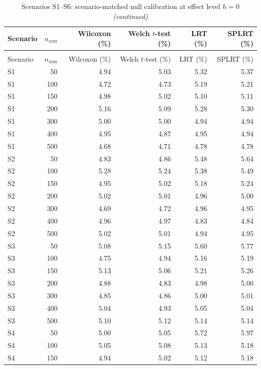 \documentclass[11pt]{article}
\begin{document}
\begin{longtable}[t]{lrrrrr}
\caption{Scenarios S1--S6: scenario-matched null calibration at effect level $h = 0$}\\
\toprule
Scenario & $n_{\mathrm{arm}}$ & Wilcoxon (\%) & Welch $t$-test (\%) & LRT (\%) & SPLRT (\%)\\
\midrule
\endfirsthead
\caption[]{Scenarios S1--S6: scenario-matched null calibration at effect level $h = 0$ \textit{(continued)}}\\
\toprule
Scenario & $n_{\mathrm{arm}}$ & Wilcoxon (\%) & Welch $t$-test (\%) & LRT (\%) & SPLRT (\%)\\
\midrule
\endhead

\endfoot
\bottomrule
\endlastfoot
S1 & 50 & 4.94 & 5.03 & 5.32 & 5.37\\
S1 & 100 & 4.72 & 4.73 & 5.19 & 5.21\\
S1 & 150 & 4.98 & 5.02 & 5.10 & 5.11\\
S1 & 200 & 5.16 & 5.09 & 5.28 & 5.30\\
S1 & 300 & 5.00 & 5.00 & 4.94 & 4.94\\
S1 & 400 & 4.95 & 4.87 & 4.95 & 4.94\\
S1 & 500 & 4.68 & 4.71 & 4.78 & 4.78\\
S2 & 50 & 4.83 & 4.86 & 5.48 & 5.64\\
S2 & 100 & 5.28 & 5.24 & 5.38 & 5.49\\
S2 & 150 & 4.95 & 5.02 & 5.18 & 5.24\\
S2 & 200 & 5.02 & 5.01 & 4.96 & 5.00\\
S2 & 300 & 4.69 & 4.72 & 4.96 & 4.95\\
S2 & 400 & 4.96 & 4.97 & 4.83 & 4.84\\
S2 & 500 & 5.02 & 5.01 & 4.94 & 4.95\\
S3 & 50 & 5.08 & 5.15 & 5.60 & 5.77\\
S3 & 100 & 4.75 & 4.94 & 5.16 & 5.19\\
S3 & 150 & 5.13 & 5.06 & 5.21 & 5.26\\
S3 & 200 & 4.88 & 4.83 & 4.98 & 5.00\\
S3 & 300 & 4.85 & 4.86 & 5.00 & 5.01\\
S3 & 400 & 5.04 & 4.93 & 5.05 & 5.04\\
S3 & 500 & 5.10 & 5.12 & 5.14 & 5.14\\
S4 & 50 & 5.00 & 5.05 & 5.72 & 5.97\\
S4 & 100 & 5.05 & 5.08 & 5.13 & 5.18\\
S4 & 150 & 4.94 & 5.02 & 5.12 & 5.18\\

\end{longtable}
\end{document}
